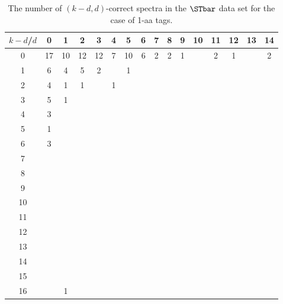 \begin{landscape}

\begin{table}[h]\footnotesize
{\centering
\begin{tabular}{|c|c|
c|c|c|c|c|c|c|c|c|c|c|c|c|c|}
  \hline
  $k-d$/$d$
 & 0 & 1 & 2 & 3 & 4 & 5 & 6 & 7 & 8 & 9 & 10 & 11 & 12 & 13 & 14\\

  \hline
  \hline

0  & 17 & 10 & 12 & 12 & 7 & 10 & 6 & 2 & 2 & 1 &  & 2 & 1 &  & 2\\

1  & 6 & 4 & 5 & 2 &  & 1 &  &  &  &  &  &  &  &  & \\

2  & 4 & 1 & 1 &  & 1 &  &  &  &  &  &  &  &  &  & \\

3  & 5 & 1 &  &  &  &  &  &  &  &  &  &  &  &  & \\

4  & 3 &  &  &  &  &  &  &  &  &  &  &  &  &  & \\

5  & 1 &  &  &  &  &  &  &  &  &  &  &  &  &  & \\

6  & 3 &  &  &  &  &  &  &  &  &  &  &  &  &  & \\

7  &  &  &  &  &  &  &  &  &  &  &  &  &  &  & \\

8  &  &  &  &  &  &  &  &  &  &  &  &  &  &  & \\

9  &  &  &  &  &  &  &  &  &  &  &  &  &  &  & \\

10  &  &  &  &  &  &  &  &  &  &  &  &  &  &  & \\

11  &  &  &  &  &  &  &  &  &  &  &  &  &  &  & \\

12  &  &  &  &  &  &  &  &  &  &  &  &  &  &  & \\

13  &  &  &  &  &  &  &  &  &  &  &  &  &  &  & \\

14  &  &  &  &  &  &  &  &  &  &  &  &  &  &  & \\

15  &  &  &  &  &  &  &  &  &  &  &  &  &  &  & \\

16  &  & 1 &  &  &  &  &  &  &  &  &  &  &  &  & \\

  \hline
\end{tabular}
\par}
\centering
\caption{The number of $(k-d,d)$-correct spectra in the $\STbar$ data set for the case of 1-aa tags.}
\vspace{3mm}
\label{table:kd-1-correct-ST-bar}
\end{table}
\end{landscape}
